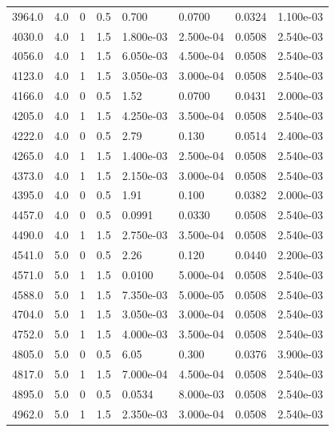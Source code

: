 \documentclass[preview]{standalone}
\begin{document}
{{{\begin{tabular}{L{1.2cm}C{1.2cm} C{0.3cm}C{0.5cm} C{1.4cm}C{1.4cm} C{1.4cm}C{1.4cm}}
  3964.0  &   4.0  & 0     & 0.5 &  0.700  & 0.0700  & 0.0324 &  1.100e-03   \\ 
  4030.0  &   4.0  & 1     & 1.5 &  1.800e-03  & 2.500e-04  & 0.0508 &  2.540e-03   \\ 
  4056.0  &   4.0  & 1     & 1.5 &  6.050e-03  & 4.500e-04  & 0.0508 &  2.540e-03   \\ 
  4123.0  &   4.0  & 1     & 1.5 &  3.050e-03  & 3.000e-04  & 0.0508 &  2.540e-03   \\ 
  4166.0  &   4.0  & 0     & 0.5 &  1.52  & 0.0700  & 0.0431 &  2.000e-03   \\ 
  4205.0  &   4.0  & 1     & 1.5 &  4.250e-03  & 3.500e-04  & 0.0508 &  2.540e-03   \\ 
  4222.0  &   4.0  & 0     & 0.5 &  2.79  & 0.130  & 0.0514 &  2.400e-03   \\ 
  4265.0  &   4.0  & 1     & 1.5 &  1.400e-03  & 2.500e-04  & 0.0508 &  2.540e-03   \\ 
  4373.0  &   4.0  & 1     & 1.5 &  2.150e-03  & 3.000e-04  & 0.0508 &  2.540e-03   \\ 
  4395.0  &   4.0  & 0     & 0.5 &  1.91  & 0.100  & 0.0382 &  2.000e-03   \\ 
  4457.0  &   4.0  & 0     & 0.5 &  0.0991  & 0.0330  & 0.0508 &  2.540e-03   \\ 
  4490.0  &   4.0  & 1     & 1.5 &  2.750e-03  & 3.500e-04  & 0.0508 &  2.540e-03   \\ 
  4541.0  &   5.0  & 0     & 0.5 &  2.26  & 0.120  & 0.0440 &  2.200e-03   \\ 
  4571.0  &   5.0  & 1     & 1.5 &  0.0100  & 5.000e-04  & 0.0508 &  2.540e-03   \\ 
  4588.0  &   5.0  & 1     & 1.5 &  7.350e-03  & 5.000e-05  & 0.0508 &  2.540e-03   \\ 
  4704.0  &   5.0  & 1     & 1.5 &  3.050e-03  & 3.000e-04  & 0.0508 &  2.540e-03   \\ 
  4752.0  &   5.0  & 1     & 1.5 &  4.000e-03  & 3.500e-04  & 0.0508 &  2.540e-03   \\ 
  4805.0  &   5.0  & 0     & 0.5 &  6.05  & 0.300  & 0.0376 &  3.900e-03   \\ 
  4817.0  &   5.0  & 1     & 1.5 &  7.000e-04  & 4.500e-04  & 0.0508 &  2.540e-03   \\ 
  4895.0  &   5.0  & 0     & 0.5 &  0.0534  & 8.000e-03  & 0.0508 &  2.540e-03   \\ 
  4962.0  &   5.0  & 1     & 1.5 &  2.350e-03  & 3.000e-04  & 0.0508 &  2.540e-03   \\ 

\end{tabular}}}}
\end{document}
